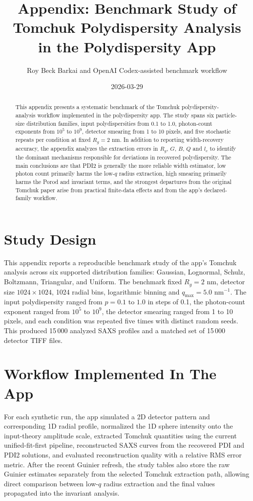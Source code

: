 \documentclass[11pt]{article}
\title{Appendix: Benchmark Study of Tomchuk Polydispersity Analysis in the Polydispersity App}
\author{Roy Beck Barkai and OpenAI Codex-assisted benchmark workflow}
\date{2026-03-29}
\begin{document}
\maketitle
\begin{abstract}
This appendix presents a systematic benchmark of the Tomchuk polydispersity-analysis workflow implemented in the polydispersity app.
The study spans six particle-size distribution families, input polydispersities from 0.1 to 1.0, photon-count exponents from $10^5$ to $10^9$, detector smearing from 1 to 10 pixels, and five stochastic repeats per condition at fixed $R_g = 2$ nm.
In addition to reporting width-recovery accuracy, the appendix analyzes the extraction errors in $R_g$, $G$, $B$, $Q$ and $l_c$ to identify the dominant mechanisms responsible for deviations in recovered polydispersity.
The main conclusions are that PDI2 is generally the more reliable width estimator, low photon count primarily harms the low-$q$ radius extraction, high smearing primarily harms the Porod and invariant terms, and the strongest departures from the original Tomchuk paper arise from practical finite-data effects and from the app's declared-family workflow.
\end{abstract}

\section{Study Design}
This appendix reports a reproducible benchmark study of the app's Tomchuk analysis across six supported distribution families: Gaussian, Lognormal, Schulz, Boltzmann, Triangular, and Uniform.
The benchmark fixed $R_g = 2$ nm, detector size $1024 \times 1024$, 1024 radial bins, logarithmic binning and $q_{\max} = 5.0$ nm$^{-1}$.
The input polydispersity ranged from $p=0.1$ to $1.0$ in steps of 0.1, the photon-count exponent ranged from $10^5$ to $10^9$, the detector smearing ranged from 1 to 10 pixels, and each condition was repeated five times with distinct random seeds.
This produced 15\,000 analyzed SAXS profiles and a matched set of 15\,000 detector TIFF files.

\section{Workflow Implemented In The App}
For each synthetic run, the app simulated a 2D detector pattern and corresponding 1D radial profile, normalized the 1D sphere intensity onto the input-theory amplitude scale, extracted Tomchuk quantities using the current unified-fit-first pipeline, reconstructed SAXS curves from the recovered PDI and PDI2 solutions, and evaluated reconstruction quality with a relative RMS error metric.
After the recent Guinier refresh, the study tables also store the raw Guinier estimates separately from the selected Tomchuk extraction path, allowing direct comparison between low-$q$ radius extraction and the final values propagated into the invariant analysis.
\end{document}
